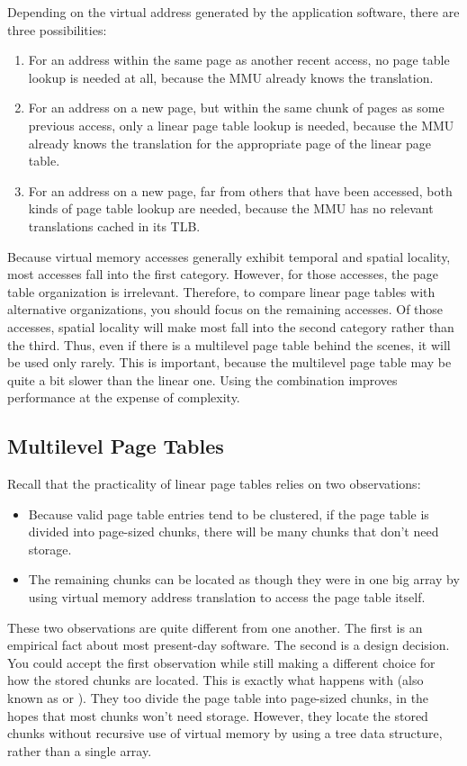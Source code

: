 Depending on the virtual address generated by the application
software, there are three possibilities:
\begin{enumerate}
\item
For an address within the same page as another recent access, no page
table lookup is needed at all, because the MMU already knows the
translation.
\item
For an address on a new page, but within the same chunk of pages as some
previous access, only a linear page table lookup is needed, because
the MMU already knows the translation for the appropriate page of the
linear page table.
\item
For an address on a new page, far from others that have been accessed,
both kinds of page table lookup are needed, because the MMU has no
relevant translations cached in its TLB.
\end{enumerate}
Because virtual memory accesses generally exhibit temporal and spatial
locality, most accesses fall into the first category.  However, for
those accesses, the
page table organization is irrelevant.  Therefore, to compare linear
page tables with alternative organizations, you should focus on the
remaining accesses.  Of those accesses, spatial locality will make
most fall into the second category rather than the third.  Thus, even
if there is a multilevel page table behind the scenes, it will be used only
rarely.  This is important, because the multilevel page table
may be quite a bit slower than the linear one.  Using the combination
improves performance at the expense of complexity.

\subsection{Multilevel Page Tables}\label{multi-level-page-tables-section}

Recall that the practicality of linear page tables relies on two
observations:
\begin{itemize}
\item
Because valid page table entries tend to be clustered, if the page
table is divided into page-sized chunks, there will be many chunks
that don't need storage.
\item
The remaining chunks can be located as though they were in one big
array by using virtual memory address translation to access the page
table itself.
\end{itemize}
These two observations are quite different from one another.  The
first is an empirical fact about most present-day software.  The
second is a design decision.  You could accept the first observation
while still making a different choice for how the stored chunks are
located.  This is exactly what happens with
 (also known as
 or
).  They too divide the page
table into page-sized chunks, in the hopes that most chunks won't need
storage.  However, they locate the stored chunks without recursive use
of virtual memory by using a tree data structure, rather than a single
array.

